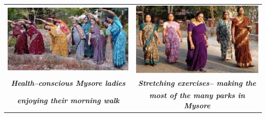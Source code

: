 \begin{center}
\begin{tabular}{@{}cc@{}}
\includegraphics[scale=.9]{images/084.jpg}&
\includegraphics[scale=.9]{images/085.jpg}\\
{\small\textbf{\textit{Health–conscious Mysore ladies}}}&
{\small\textbf{\textit{Stretching exercises– making the}}}\\
{\small\textbf{\textit{enjoying their morning walk}}} &
{\small\textbf{\textit{most of the many parks in Mysore}}}\\

\end{tabular}
\end{center}
